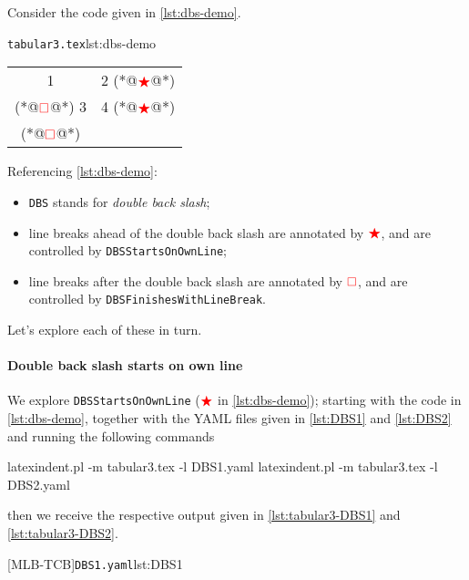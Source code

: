 	Consider the code given in \cref{lst:dbs-demo}.
	\begin{cmhlistings}[style=tcblatex,escapeinside={(*@}{@*)}]{\texttt{tabular3.tex}}{lst:dbs-demo}
\begin{tabular}{cc}
 1 & 2 (*@$\color{red}\bigstar$@*)\\(*@$\color{red}\square$@*) 3 & 4 (*@$\color{red}\bigstar$@*)\\(*@$\color{red}\square$@*)
\end{tabular}
\end{cmhlistings}
	Referencing \cref{lst:dbs-demo}:
	\begin{itemize}
		\item \texttt{DBS} stands for \emph{double back slash};
		\item line breaks ahead of the double back slash are annotated by $\color{red}\bigstar$, and
		      are controlled by \texttt{DBSStartsOnOwnLine};
		\item line breaks after the double back slash are annotated by $\color{red}\square$,
		      and are controlled by \texttt{DBSFinishesWithLineBreak}.
	\end{itemize}

	Let's explore each of these in turn.

	\paragraph{Double back slash starts on own line}
		We explore \texttt{DBSStartsOnOwnLine} ($\color{red}\bigstar$ in \cref{lst:dbs-demo});
		starting with the code in \cref{lst:dbs-demo}, together with the YAML files given in
		\cref{lst:DBS1} and \cref{lst:DBS2} and running the following commands  
		\begin{commandshell}
latexindent.pl -m tabular3.tex -l DBS1.yaml
latexindent.pl -m tabular3.tex -l DBS2.yaml
\end{commandshell}
		then we receive the respective output given in \cref{lst:tabular3-DBS1} and
		\cref{lst:tabular3-DBS2}.

		\begin{cmhtcbraster}[raster column skip=.01\linewidth]
			{\texttt{DBS1.yaml}}{lst:DBS1}
		\end{cmhtcbraster}

